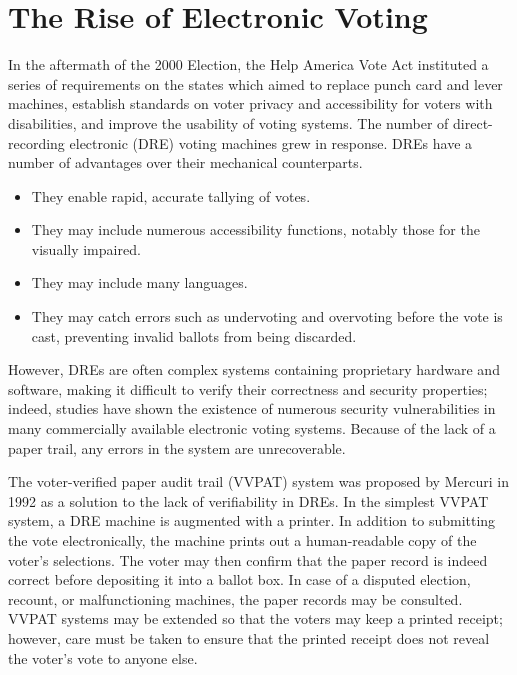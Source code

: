 \section{The Rise of Electronic Voting} \label{intro:evoting}

In the aftermath of the 2000 Election, the Help America Vote Act instituted a series of requirements on the states which aimed to replace punch card and lever machines, establish standards on voter privacy and accessibility for voters with disabilities, and improve the usability of voting systems. The number of direct-recording electronic (DRE) voting machines grew in response. DREs have a number of advantages over their mechanical counterparts.
\begin{itemize}
\item They enable rapid, accurate tallying of votes.
\item They may include numerous accessibility functions, notably those for the visually impaired.
\item They may include many languages.
\item They may catch errors such as undervoting and overvoting before the vote is cast, preventing invalid ballots from being discarded.
\end{itemize}

However, DREs are often complex systems containing proprietary hardware and software, making it difficult to verify their correctness and security properties; indeed, studies \cite{wiki:dre, feldman07, gonggrijp06} have shown the existence of numerous security vulnerabilities in many commercially available electronic voting systems. Because of the lack of a paper trail, any errors in the system are unrecoverable.

The voter-verified paper audit trail (VVPAT) system was proposed by Mercuri \cite{mercuri:vvpat} in 1992 as a solution to the lack of verifiability in DREs. In the simplest VVPAT system, a DRE machine is augmented with a printer. In addition to submitting the vote electronically, the machine prints out a human-readable copy of the voter's selections. The voter may then confirm that the paper record is indeed correct before depositing it into a ballot box. In case of a disputed election, recount, or malfunctioning machines, the paper records may be consulted. VVPAT systems may be extended so that the voters may keep a printed receipt; however, care must be taken to ensure that the printed receipt does not reveal the voter's vote to anyone else.

